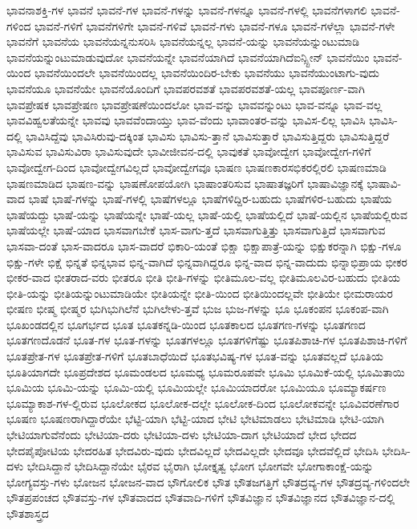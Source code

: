 {ಭಾವನಾಶಕ್ತಿ-ಗಳ
ಭಾವನೆ
ಭಾವನೆ-ಗಳ
ಭಾವನೆ-ಗಳನ್ನು
ಭಾವನೆ-ಗಳನ್ನೂ
ಭಾವನೆ-ಗಳಲ್ಲಿ
ಭಾವನೆಗಳಾಗಲಿ
ಭಾವನೆ-ಗಳಿಂದ
ಭಾವನೆ-ಗಳಿಗೆ
ಭಾವನೆಗಳಿಗೇ
ಭಾವನೆ-ಗಳಿವೆ
ಭಾವನೆ-ಗಳು
ಭಾವನೆ-ಗಳೂ
ಭಾವನೆ-ಗಳೆಲ್ಲಾ
ಭಾವನೆ-ಗಳೇ
ಭಾವನೆಗೆ
ಭಾವನೆಯ
ಭಾವನೆಯನ್ನನುಸರಿಸಿ
ಭಾವನೆಯನ್ನಲ್ಲ
ಭಾವನೆ-ಯನ್ನು
ಭಾವನೆಯನ್ನುಂಟುಮಾಡಿ
ಭಾವನೆಯನ್ನುಂಟುಮಾಡುವುದೋ
ಭಾವನೆಯನ್ನೇ
ಭಾವನೆಯಾಗಿದೆ
ಭಾವನೆಯಾಗಿದೆಐನ್ಸ್ಟೀನ್
ಭಾವನೆಯಿಂ
ಭಾವನೆ-ಯಿಂದ
ಭಾವನೆಯಿಂದಲೇ
ಭಾವನೆಯಿಂದಲ್ಲ
ಭಾವನೆಯಿಂದಿರ-ಬೇಕು
ಭಾವನೆಯು
ಭಾವನೆಯುಂಟಾಗು-ವುದು
ಭಾವನೆಯೂ
ಭಾವನೆಯೇ
ಭಾವನೆಯೊಂದಿಗೆ
ಭಾವಪರವಶತೆ
ಭಾವಪರವಶತೆ-ಯಲ್ಲ
ಭಾವಪೂರ್ಣ-ವಾಗಿ
ಭಾವಪ್ರೇಷಕ
ಭಾವಪ್ರೇಷಣ
ಭಾವಪ್ರೇಷಣೆಯಿಂದಲೋ
ಭಾವ-ವನ್ನು
ಭಾವವನ್ನುಂಟು
ಭಾವ-ವನ್ನೂ
ಭಾವ-ವಲ್ಲ
ಭಾವವಿಹ್ವಲತೆಯನ್ನೇ
ಭಾವವು
ಭಾವವೆಂದಾಯ್ತು
ಭಾವ-ವೆಂದು
ಭಾವಾಂತರ-ವನ್ನು
ಭಾವಿಸ-ಲಿಲ್ಲ
ಭಾವಿಸಿ
ಭಾವಿಸಿ-ದಲ್ಲಿ
ಭಾವಿಸಿದ್ದೆವು
ಭಾವಿಸಿರುವು-ದಕ್ಕಿಂತ
ಭಾವಿಸು
ಭಾವಿಸು-ತ್ತಾನೆ
ಭಾವಿಸುತ್ತಾರೆ
ಭಾವಿಸುತ್ತಿದ್ದರು
ಭಾವಿಸುತ್ತಿದ್ದರೆ
ಭಾವಿಸುವ
ಭಾವಿಸುವಿರಾ
ಭಾವಿಸುವುದೇ
ಭಾವೀಜೀವನ-ದಲ್ಲಿ
ಭಾವುಕತೆ
ಭಾವೋದ್ವೇಗ
ಭಾವೋದ್ವೇಗ-ಗಳಿಗೆ
ಭಾವೋದ್ವೇಗ-ದಿಂದ
ಭಾವೋದ್ವೇಗವಿಲ್ಲದೆ
ಭಾವೋದ್ವೇಗವೂ
ಭಾಷಣ
ಭಾಷಣಕಾರಸಭಿಕರಲ್ಲಿರಲಿ
ಭಾಷಣಮಾಡಿ
ಭಾಷಣಮಾಡಿದ
ಭಾಷಣ-ವನ್ನು
ಭಾಷಣೋಪಯೋಗಿ
ಭಾಷಾಂತರಿಸುವ
ಭಾಷಾತಜ್ಞರಿಗೆ
ಭಾಷಾವಿಜ್ಞಾನಕ್ಕೆ
ಭಾಷಾವಿ-ವಾದ
ಭಾಷೆ
ಭಾಷೆ-ಗಳನ್ನು
ಭಾಷೆ-ಗಳಲ್ಲಿ
ಭಾಷೆಗಳಲ್ಲೂ
ಭಾಷೆಗಳಿದ್ದಿರ-ಬಹುದು
ಭಾಷೆಗಳಿರ-ಬಹುದು
ಭಾಷೆಯ
ಭಾಷೆಯದ್ದು
ಭಾಷೆ-ಯನ್ನು
ಭಾಷೆಯನ್ನೇ
ಭಾಷೆ-ಯಲ್ಲ
ಭಾಷೆ-ಯಲ್ಲಿ
ಭಾಷೆಯಲ್ಲಿದೆ
ಭಾಷೆ-ಯಲ್ಲಿನ
ಭಾಷೆಯಲ್ಲಿರುವ
ಭಾಷೆಯಲ್ಲೇ
ಭಾಷೆ-ಯಾದ
ಭಾಸವಾಗಬೇಕೆ
ಭಾಸ-ವಾಗು-ತ್ತದೆ
ಭಾಸವಾಗುತ್ತಿತ್ತು
ಭಾಸವಾಗುತ್ತಿದೆ
ಭಾಸವಾಗುವ
ಭಾಸವಾ-ದಂತೆ
ಭಾಸ-ವಾದರೂ
ಭಾಸ-ವಾದರೆ
ಭಿಕಾರಿ-ಯಂತೆ
ಭಿಕ್ಷಾ
ಭಿಕ್ಷಾಪಾತ್ರೆ-ಯನ್ನು
ಭಿಕ್ಷುಕರನ್ನಾಗಿ
ಭಿಕ್ಷು-ಗಳೂ
ಭಿಕ್ಷು-ಗಳೇ
ಭಿಕ್ಷೆ
ಭಿನ್ನತೆ
ಭಿನ್ನಭಾವ
ಭಿನ್ನ-ವಾಗಿದೆ
ಭಿನ್ನವಾಗಿದ್ದರೂ
ಭಿನ್ನ-ವಾದ
ಭಿನ್ನ-ವಾದುದು
ಭಿನ್ನಾಭಿಪ್ರಾಯ
ಭೀಕರ
ಭೀಕರ-ವಾದ
ಭೀತರಾದ-ವರು
ಭೀತರೂ
ಭೀತಿ
ಭೀತಿ-ಗಳನ್ನು
ಭೀತಿಮೂಲ-ವಲ್ಲ
ಭೀತಿಮೂಲವಿರ-ಬಹುದು
ಭೀತಿಯ
ಭೀತಿ-ಯನ್ನು
ಭೀತಿಯನ್ನುಂಟುಮಾಡಿಯೇ
ಭೀತಿಯನ್ನೇ
ಭೀತಿ-ಯಿಂದ
ಭೀತಿಯಿಂದಲ್ಲವೇ
ಭೀತಿಯೇ
ಭೀಮರಾಯರ
ಭೀಷಣ
ಭೀಷ್ಮ
ಭೀಷ್ಮರ
ಭುಗಿಭುಗಿಲೆನೆ
ಭುಗಿಲೇಳು-ತ್ತವೆ
ಭುಜ
ಭುಜ-ಗಳನ್ನು
ಭೂ
ಭೂಕಂಪನ
ಭೂಕಂಪ-ವಾಗಿ
ಭೂಖಂಡದಲ್ಲಿನ
ಭೂಗರ್ಭದ
ಭೂತ
ಭೂತಕನ್ನಡಿ-ಯಿಂದ
ಭೂತಕಾಲದ
ಭೂತಗಣ-ಗಳನ್ನು
ಭೂತಗಣದ
ಭೂತಗಣದೊಡನೆ
ಭೂತ-ಗಳ
ಭೂತ-ಗಳನ್ನು
ಭೂತಗಳಲ್ಲೂ
ಭೂತಗಳಿಗೆಷ್ಟು
ಭೂತಪಿಶಾಚಿ-ಗಳ
ಭೂತಪಿಶಾಚಿ-ಗಳಿಗೆ
ಭೂತಪ್ರೇತ-ಗಳ
ಭೂತಪ್ರೇತ-ಗಳಿಗೆ
ಭೂತಬಾಧೆಯಿದೆ
ಭೂತಭವಿಷ್ಯ-ಗಳ
ಭೂತ-ವನ್ನು
ಭೂತವಲ್ಲದೆ
ಭೂತಿಯ
ಭೂತಿಯಾಗದೇ
ಭೂಪ್ರದೇಶದ
ಭೂಮಂಡಲದ
ಭೂಮಧ್ಯ
ಭೂಮರೂಪವೇ
ಭೂಮಿ
ಭೂಮಿಕೆ-ಯಲ್ಲಿ
ಭೂಮಿತಾಯಿ
ಭೂಮಿಯ
ಭೂಮಿ-ಯನ್ನು
ಭೂಮಿ-ಯಲ್ಲಿ
ಭೂಮಿಯಲ್ಲೇ
ಭೂಮಿಯಾದರೋ
ಭೂಮಿಯೂ
ಭೂಮ್ಯಾಕರ್ಷಣ
ಭೂಮ್ಯಾಕಾಶ-ಗಳ-ಲ್ಲಿರುವ
ಭೂಲೋಕದ
ಭೂಲೋಕ-ದಲ್ಲೇ
ಭೂಲೋಕ-ದಿಂದ
ಭೂಲೋಕವನ್ನೇ
ಭೂವಿವರಣೆಗಾರ
ಭೂಷಣ
ಭೂಷಣರಾಗಿದ್ದಾರೆಯೇ
ಭೆಟ್ಟಿ-ಯಾಗಿ
ಭೆಟ್ಟಿ-ಯಾದ
ಭೇಟಿ
ಭೇಟಿಮಾಡಲು
ಭೇಟಿಮಾಡಿ
ಭೇಟಿ-ಯಾಗಿ
ಭೇಟಿಯಾಗುವೆನೆಂದು
ಭೇಟಿಯಾ-ದರು
ಭೇಟಿಯಾ-ದಳು
ಭೇಟಿಯಾ-ದಾಗ
ಭೇಟಿಯಾದೆ
ಭೇದ
ಭೇದದ
ಭೇದಪೈಪೋಟಿಯ
ಭೇದರಹಿತ
ಭೇದವಿರು-ವುದು
ಭೇದವಿಲ್ಲದೆ
ಭೇದವಿಲ್ಲದೇ
ಭೇದವೂ
ಭೇದವೆಲ್ಲಿದೆ
ಭೇದಿಸಿ
ಭೇದಿಸಿ-ದಳು
ಭೇದಿಸಿದ್ದಾನೆ
ಭೇದಿಸಿದ್ದಾನೆಯೇ
ಭೈರವ
ಭೈರಾಗಿ
ಭೋಕ್ತೃತ್ವ
ಭೋಗ
ಭೋಗವೇ
ಭೋಗಾಕಾಂಕ್ಷೆ-ಯನ್ನು
ಭೋಗ್ಯವಸ್ತು-ಗಳು
ಭೋಜನ
ಭೋಜನ-ವಾದ
ಭೌಗೋಲಿಕ
ಭೌತ
ಭೌತಜಗತ್ತಿಗೆ
ಭೌತದ್ರವ್ಯ-ಗಳ
ಭೌತದ್ರವ್ಯ-ಗಳಿಂದಲೇ
ಭೌತಪ್ರಪಂಚದ
ಭೌತವಸ್ತು-ಗಳ
ಭೌತವಾದದ
ಭೌತವಾದಿ-ಗಳಿಗೆ
ಭೌತವಿಜ್ಞಾನ
ಭೌತವಿಜ್ಞಾನದ
ಭೌತವಿಜ್ಞಾನ-ದಲ್ಲಿ
ಭೌತಶಾಸ್ತ್ರದ
}
